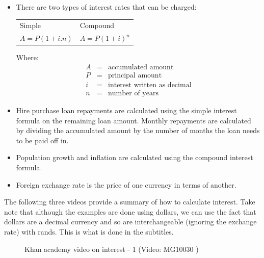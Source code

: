 \summary

\begin{itemize}
    \item There are two types of interest rates that can be charged:\\
    
    \begin{tabularx}{\textwidth}{ XX }
	Simple	&	Compound\\
	$A = P (1 + i . n)$	&	$A = P(1 + i)^n$\\
    \end{tabularx}
    \par
    Where:
    \begin{eqnarray*}
	A &=& \text{accumulated amount}\\
	P &=& \text{principal amount}\\
	i &=& \text{interest written as decimal}\\
	n &=& \text{number of years}
    \end{eqnarray*}

    \item Hire purchase loan repayments are calculated using the simple interest formula on the remaining loan amount. Monthly repayments are calculated by dividing the accumulated amount by the number of months the loan needs to be paid off in.

    \item Population growth and inflation are calculated using the compound interest formula.

    \item Foreign exchange rate is the price of one currency in terms of another.
\end{itemize}


The following three videos provide a summary of how to calculate interest. Take note that although the examples are done using dollars, we can use the fact that dollars are a decimal currency and so are interchangeable (ignoring the exchange rate) with rands. This is what is done in the subtitles.\par 

\begin{figure}[H]
    \textnormal{Khan academy video on interest - 1}
    \vspace{.1in}
    \nopagebreak
     { (Video:  MG10030 )}
 \end{figure}

